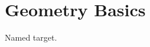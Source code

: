 \documentclass{article}
\begin{document}
\section{Geometry Basics}\label{geometry-basics}

\hypertarget{geometry-basics}{}

Named target.
\end{document}
